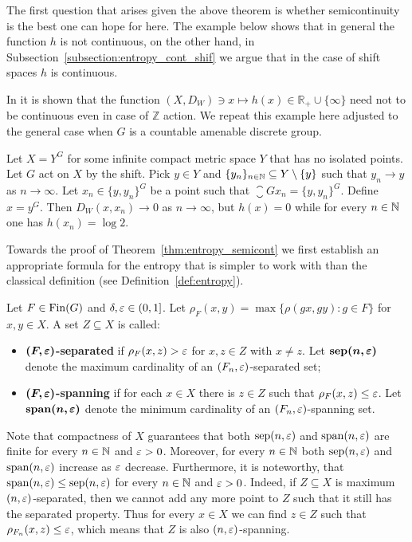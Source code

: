 \noindent The first question that arises given the above theorem is whether semicontinuity is the best one can hope for here.
%
The example below shows that in general the function $h$ is not continuous, on the other hand, in Subsection~\ref{subsection:entropy_cont_shif} we argue that in the case of shift spaces $h$ is continuous. 


\begin{example}\label{entropianiejestciagla}
In \cite[Example 3]{DI88} it is shown that the function $(X,D_W)\ni x\mapsto h(x)\in \mathbb R_+\cup\{\infty\}$ need not to be continuous even in case of $\mathbb Z$ action. We repeat this example here adjusted to the general case when $G$ is a countable amenable discrete group. 

Let $X=Y^G$ for some infinite compact metric space $Y$ that has no isolated points. Let $G$ act on $X$ by the shift. Pick $y\in Y$ and $\{y_n\}_{n\in\mathbb{N}}\subseteq Y\setminus\{y\}$ such that $y_n\to y$ as $n\to\infty$. Let $x_n\in\{y,y_n\}^G$ be a point such that $\closure{Gx_n}=\{y,y_n\}^G$. Define $x=y^G$. Then $D_W(x,x_n)\to 0$ as $n\to\infty$, but $h(x)=0$ while for every $n\in\mathbb{N}$ one has $h(x_n)=\log 2$.
\end{example}

Towards the proof of Theorem~\ref{thm:entropy_semicont} we first establish an appropriate formula for the entropy that is simpler to work with than the classical definition (see Definition~\ref{def:entropy}).
%
\begin{defn}
Let $F\in\operatorname{Fin}(G)$  and $\delta, \varepsilon\in(0,1]$. Let $\rho_F(x,y)= \max\{\rho(gx,gy)\colon g\in F\}$ for $x,y\in X$. A set $Z\subseteq X$ is called:
\begin{itemize}
\item {\bf$\bm{(F,\varepsilon)}$-separated} if $\rho_F(x,z)>\varepsilon$ for $x,z\in Z$ with $x\neq z$. 
Let $\bm{\sep(n,\eps)}$ denote the maximum cardinality of an $(F_n, \varepsilon)$-separated set;
\item {\bf$\bm{(F,\varepsilon)}$-spanning} if for each $x\in X$ there is $z\in Z$ such that $\rho_F(x,z)\leq\varepsilon$. Let $\bm{\spn(n,\eps)}$ denote the minimum cardinality of an $(F_n, \varepsilon)$-spanning set.
\end{itemize}
\end{defn}
\noindent
Note that compactness of $X$ guarantees that both $\operatorname{sep}(n,\varepsilon)$ and $\operatorname{span}(n,\varepsilon)$ are finite for every $n\in\mathbb{N}$ and $\varepsilon>0$. Moreover, for every $n\in\mathbb{N}$ both $\operatorname{sep}(n,\varepsilon)$ and $\operatorname{span}(n,\varepsilon)$ increase as $\varepsilon$ decrease. Furthermore, it is noteworthy, that $\operatorname{span}(n,\varepsilon)\leq \operatorname{sep}(n,\varepsilon)$ for every $n\in\mathbb{N}$ and $\varepsilon>0$. Indeed, if $Z\subseteq X$ is maximum $(n,\varepsilon)$-separated, then we cannot add any more point to $Z$ such that it still has the separated property. Thus for every $x\in X$ we can find $z\in Z$ such that $\rho_{F_n}(x,z)\leq \varepsilon$, which means that $Z$ is also $(n,\varepsilon)$-spanning. 

